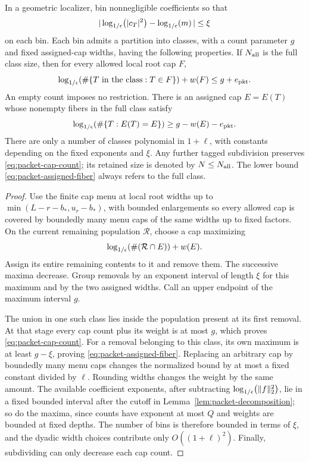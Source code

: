 \begin{lemma}
\label{lem:cap-class}
In a geometric localizer, bin nonnegligible coefficients so that
\begin{equation}
 |\log_{1/\epsilon}\!\left(|c_T|^2\right)-\log_{1/\epsilon}\!\left(m\right)|\le\xi
 \label{eq:packet-mass-bin}
\end{equation}
on each bin.  Each bin admits a partition into classes, with a
count parameter \(g\) and fixed assigned-cap widths, having the
following properties.  If \(N_{\rm all}\) is the full class size,
then for every allowed local root cap \(F\),
\begin{equation}
 \log_{1/\epsilon}\!\left(\#\{T\hbox{ in the class}:T\in F\}\right)+w(F)
 \le g+e_{\rm pkt}.
 \label{eq:packet-cap-count}
\end{equation}
An empty count imposes no restriction.  There is an assigned cap
\(E=E(T)\) whose nonempty fibers in the full class satisfy
\begin{equation}
 \log_{1/\epsilon}\!\left(\#\{T:E(T)=E\}\right)
 \ge g-w(E)-e_{\rm pkt}.
 \label{eq:packet-assigned-fiber}
\end{equation}
There are only a number of classes polynomial in \(1+\ell\), with
constants depending on the fixed exponents and \(\xi\).
Any further tagged subdivision preserves
\eqref{eq:packet-cap-count}; its retained size is denoted by
\(N\le N_{\rm all}\).  The lower bound
\eqref{eq:packet-assigned-fiber} always refers to the full class.
\end{lemma}

\begin{proof}
Use the finite cap menu at local root widths up to
\(\min(L-r-b_*,u_r-b_*)\), with bounded enlargements so every
allowed cap is covered by boundedly many menu caps of the same
widths up to fixed factors.  On the current remaining population
\(\mathcal R\), choose a cap maximizing
\[
 \log_{1/\epsilon}\!\left(\#(\mathcal R\cap E)\right)+w(E).
\]
Assign its entire remaining contents to it and remove them.
The successive maxima
decrease.  Group removals by an exponent interval of length \(\xi\)
for this maximum and by the two assigned widths.  Call an upper
endpoint of the maximum interval \(g\).

The union in one such class lies inside the population present at
its first removal.  At that stage every cap count plus its weight
is at most \(g\), which proves \eqref{eq:packet-cap-count}.
For a removal belonging to this class, its own maximum is at least
\(g-\xi\), proving \eqref{eq:packet-assigned-fiber}.
Replacing an arbitrary cap by boundedly many menu caps changes the
normalized bound by at most a fixed constant divided by \(\ell\).
Rounding widths changes the weight by the same amount.  The
available coefficient exponents, after subtracting
\(\log_{1/\epsilon}\!\left(\|f\|_2^2\right)\), lie in a fixed bounded interval
after the cutoff in Lemma~\ref{lem:packet-decomposition}; so do
the maxima, since counts have exponent at most \(Q\) and weights
are bounded at fixed depths.  The number of bins is therefore
bounded in terms of \(\xi\), and the dyadic width choices contribute
only \(O((1+\ell)^2)\).  Finally, subdividing can only decrease
each cap count.
\end{proof}

